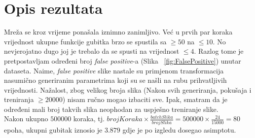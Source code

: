 \section{Opis rezultata}
Mreža se kroz vrijeme ponašala iznimno zanimljivo.
Već u prvih par koraka vrijednost ukupne funkcije gubitka brzo se spustila sa $\geq 50$ na $\leq 10$.
No nevjerojatno dugo joj je trebalo da se spusti na vrijednost $\leq 4$.
Razlog tome je pretpostavljam određeni broj \emph{false positive}-a (Slika ~\ref{fig:FalsePositive}) unutar dataseta.
Naime, \emph{false positive} slike nastale su primjenom transformacija nasumično generiranim parametrima koji su se našli na rubu prihvatljivih vrijednosti.
Nažalost, zbog velikog broja slika (Nakon svih generiranja, pokušaja i treniranja $\geq 20000$) nisam ručno mogao izbaciti sve.
Ipak, smatram da je određeni mali broj takvih slika neophodan za uspješno treniranje slike. \\
Nakon ukupno $500 000$ koraka, tj. $brojKoraka \times \frac{batchSlika}{brojSlika} = 500000 \times \frac{24}{15000} = 80$ epoha,  ukupni gubitak iznosio je $3.879$ gdje je po izgledu dosegao asimptotu.
